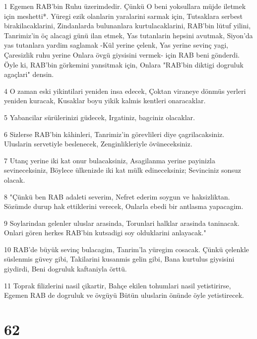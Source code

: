 \par 1 Egemen RAB'bin Ruhu üzerimdedir. Çünkü O beni yoksullara müjde iletmek için meshetti*. Yüregi ezik olanlarin yaralarini sarmak için, Tutsaklara serbest birakilacaklarini, Zindanlarda bulunanlara kurtulacaklarini, RAB'bin lütuf yilini, Tanrimiz'in öç alacagi günü ilan etmek, Yas tutanlarin hepsini avutmak, Siyon'da yas tutanlara yardim saglamak -Kül yerine çelenk, Yas yerine sevinç yagi, Çaresizlik ruhu yerine Onlara övgü giysisini vermek- için RAB beni gönderdi. Öyle ki, RAB'bin görkemini yansitmak için, Onlara "RAB'bin diktigi dogruluk agaçlari" densin.
\par 4 O zaman eski yikintilari yeniden insa edecek, Çoktan viraneye dönmüs yerleri yeniden kuracak, Kusaklar boyu yikik kalmis kentleri onaracaklar.
\par 5 Yabancilar sürülerinizi güdecek, Irgatiniz, bagciniz olacaklar.
\par 6 Sizlerse RAB'bin kâhinleri, Tanrimiz'in görevlileri diye çagrilacaksiniz. Uluslarin servetiyle beslenecek, Zenginlikleriyle övüneceksiniz.
\par 7 Utanç yerine iki kat onur bulacaksiniz, Asagilanma yerine payinizla sevineceksiniz, Böylece ülkenizde iki kat mülk edineceksiniz; Sevinciniz sonsuz olacak.
\par 8 "Çünkü ben RAB adaleti severim, Nefret ederim soygun ve haksizliktan. Sözümde durup hak ettiklerini verecek, Onlarla ebedi bir antlasma yapacagim.
\par 9 Soylarindan gelenler uluslar arasinda, Torunlari halklar arasinda taninacak. Onlari gören herkes RAB'bin kutsadigi soy olduklarini anlayacak."
\par 10 RAB'de büyük sevinç bulacagim, Tanrim'la yüregim cosacak. Çünkü çelenkle süslenmis güvey gibi, Takilarini kusanmis gelin gibi, Bana kurtulus giysisini giydirdi, Beni dogruluk kaftaniyla örttü.
\par 11 Toprak filizlerini nasil çikartir, Bahçe ekilen tohumlari nasil yetistirirse, Egemen RAB de dogruluk ve övgüyü Bütün uluslarin önünde öyle yetistirecek.

\chapter{62}

